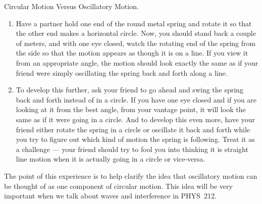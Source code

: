 \begin{aproblem}{Circular Motion Versus Oscillatory Motion.}
  \begin{enumerate}
  \item Have a partner hold one end of the round metal spring and
    rotate it so that the other end makes a horizontal circle.  Now,
    you should stand back a couple of meters, and with one eye closed,
    watch the rotating end of the spring from the side so that the
    motion appears as though it is on a line.  If you view it from an
    appropriate angle, the motion should look exactly the same as if
    your friend were simply oscillating the spring back and forth
    along a line.

  \item To develop this further, ask your friend to go ahead and swing
    the spring back and forth instead of in a circle.  If you have one
    eye closed and if you are looking at it from the best angle, from
    your vantage point, it will look the same as if it were going in a
    circle.  And to develop this even more, have your friend either
    rotate the spring in a circle or oscillate it back and forth while
    you try to figure out which kind of motion the spring is
    following.  Treat it as a challenge --- your friend should try to
    fool you into thinking it is straight line motion when it is
    actually going in a circle or vice-versa.
  \end{enumerate}

  The point of this experience is to help clarify the idea that
  oscillatory motion can be thought of as one component of circular
  motion.  This idea will be very important when we talk about waves
  and interference in PHYS~212.
\label{prob:circ_vs_osc}
\end{aproblem}




